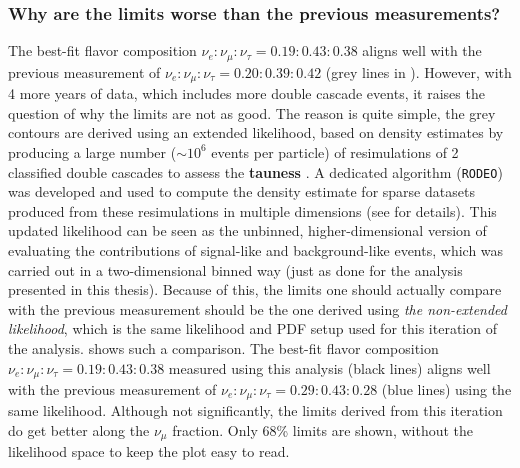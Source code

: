 \subsubsection{Why are the limits worse than the previous measurements?}

The best-fit flavor composition $\nu_e:\nu_{\mu}:\nu_{\tau} = 0.19:0.43:0.38$ aligns well with the previous measurement  of $\nu_e:\nu_{\mu}:\nu_{\tau} = 0.20:0.39:0.42$ (grey lines in ). However, with 4 more years of data, which includes more double cascade events, it raises the question of why the limits are not as good. The reason is quite simple, the grey contours are derived using an extended likelihood, based on density estimates by producing a large number ($\sim10^6$ events per particle) of resimulations of 2 classified double cascades to assess the \textbf{tauness} . A dedicated algorithm (\texttt{RODEO}) was developed and used to compute the density estimate for sparse datasets produced from these resimulations in multiple dimensions (see  for details). This updated likelihood can be seen as the unbinned, higher-dimensional version of evaluating the contributions of signal-like and background-like events, which was carried out in a two-dimensional binned way (just as done for the analysis presented in this thesis).  Because of this, the limits one should actually compare with the previous measurement should be the one derived using \emph{the non-extended likelihood}, which is the same likelihood and PDF setup used for this iteration of the analysis.  shows such a comparison. The best-fit flavor composition $\nu_e:\nu_{\mu}:\nu_{\tau} = 0.19:0.43:0.38$ measured using this analysis (black lines) aligns well with the previous measurement of $\nu_e:\nu_{\mu}:\nu_{\tau} = 0.29:0.43:0.28$ (blue lines) using the same likelihood. Although not significantly, the limits derived from this iteration do get better along the $\nu_{\mu}$ fraction. Only 68\% limits are shown, without the likelihood space to keep the plot easy to read.

